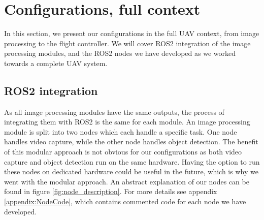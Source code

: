 

\section{Configurations, full context}

In this section, we present our configurations in the full UAV context, from image processing to the flight controller. We will cover ROS2 integration of the image processing modules, and the ROS2 nodes we have developed as we worked towards a complete UAV system.

\subsection{ROS2 integration}

As all image processing modules have the same outputs, the process of integrating them with ROS2 is the same for each module.
An image processing module is split into two nodes which each handle a specific task. One node handles video capture, while the other node handles object detection. The benefit of this modular approach is not obvious for our configurations as both video capture and object detection run on the same hardware. Having the option to run these nodes on dedicated hardware could be useful in the future, which is why we went with the modular approach. An abstract explanation of our nodes can be found in figure \ref{fig:node_description}. For more details see appendix \ref{appendix:NodeCode}, which contains commented code for each node we have developed.

